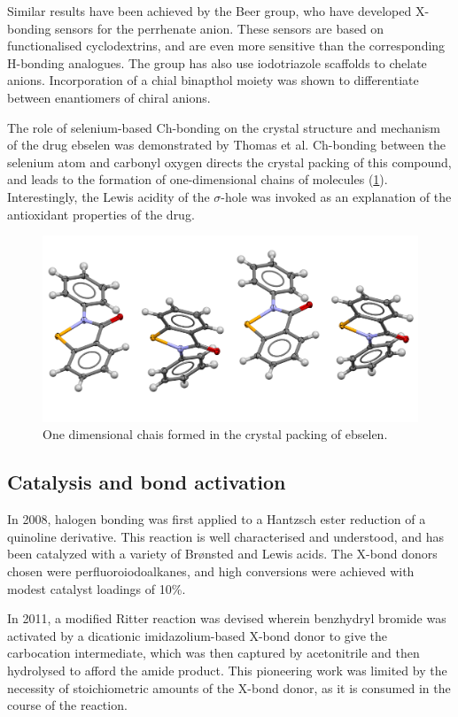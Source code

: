 \begin{refsection}
Similar results have been achieved by the Beer group, who have developed X-bonding sensors for the perrhenate anion.\autocite{Cornes2017}
These sensors are based on functionalised cyclodextrins, and are even more sensitive than the corresponding H-bonding analogues.
The group has also use iodotriazole scaffolds to chelate anions.\autocite{Borissov2017}
Incorporation of a chial binapthol moiety was shown to differentiate between enantiomers of chiral anions.

The role of selenium-based Ch-bonding on the crystal structure and mechanism of the drug ebselen was demonstrated by Thomas et al.\autocite{Thomas2015}
Ch-bonding between the selenium atom and carbonyl oxygen directs the crystal packing of this compound, and leads to the formation of one-dimensional chains of molecules (\cref{fig:ebs-packing}).
Interestingly, the Lewis acidity of the $\sigma$-hole was invoked as an explanation of the antioxidant properties of the drug.

\begin{figure}
    \centering
    \includegraphics[width=0.7\linewidth]{Figures/ebs-packing.pdf}
    \caption{One dimensional chais formed in the crystal packing of ebselen.}
    \label{fig:ebs-packing}
\end{figure}

\subsection{Catalysis and bond activation}
In 2008, halogen bonding was first applied to a Hantzsch ester reduction of a quinoline derivative.\autocite{Bruckmann2008}
This reaction is well characterised and understood, and has been catalyzed with a variety of Br\o nsted and Lewis acids.
The X-bond donors chosen were perfluoroiodoalkanes, and high conversions were achieved with modest catalyst loadings of 10\%.

In 2011, a modified Ritter reaction was devised wherein benzhydryl bromide was activated by a dicationic imidazolium-based X-bond donor to give the carbocation intermediate, which was then captured by acetonitrile and then hydrolysed to afford the amide product.\autocite{Walter2011}
This pioneering work was limited by the necessity of stoichiometric amounts of the X-bond donor, as it is consumed in the course of the reaction.


\end{refsection}
